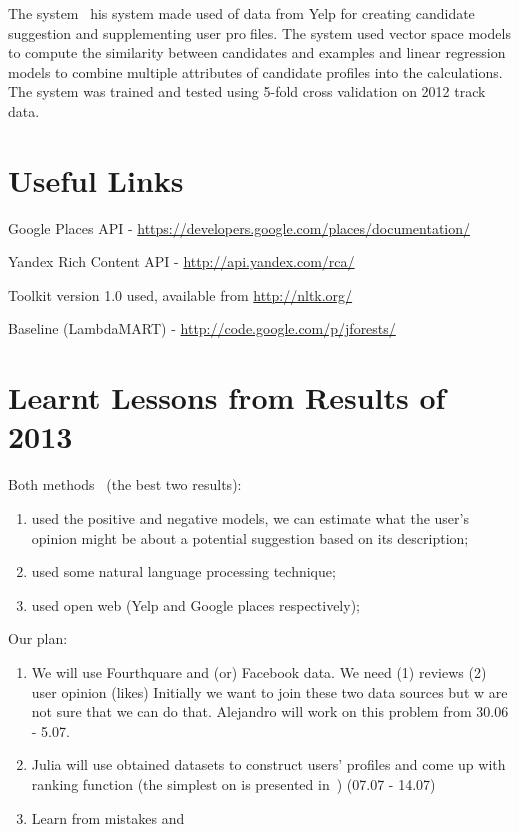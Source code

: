 \documentclass{llncs}
\begin{document}
The system~\cite{Jiang_2013} his system made used of data from Yelp for creating candidate suggestion and supplementing user profiles. The system used vector space models to compute the similarity between candidates and examples and linear
regression models to combine multiple attributes of candidate profiles into the calculations. The system was
trained and tested using 5-fold cross validation on 2012 track data.

\section{Useful Links}

Google Places API - \url{https://developers.google.com/places/documentation/}

Yandex Rich Content API - \url{http://api.yandex.com/rca/}

Toolkit version 1.0 used, available from \url{http://nltk.org/}

Baseline (LambdaMART) - \url{http://code.google.com/p/jforests/}

\section{Learnt Lessons from Results of 2013}
Both methods~\cite{Yang_2013,Rikitianskii_2013} (the best two results):
\begin{enumerate}
\item used the positive and negative models, we can estimate what the user's opinion might be about a potential suggestion based on its description;
\item used some natural language processing technique;
\item used open web (Yelp and Google places respectively);
\end{enumerate}

Our plan:
\begin{enumerate}
\item We will use Fourthquare and (or) Facebook data. We need (1) reviews (2) user opinion (likes) Initially we want to join these two data sources but w are not sure that we can do that. Alejandro will work on this problem from  30.06 - 5.07.
\item Julia will use obtained datasets to construct users' profiles and come up with ranking function (the simplest on is presented in~\cite{Yang_2013}) (07.07 - 14.07)
\item Learn from mistakes and 
\end{enumerate}	



\end{document}

